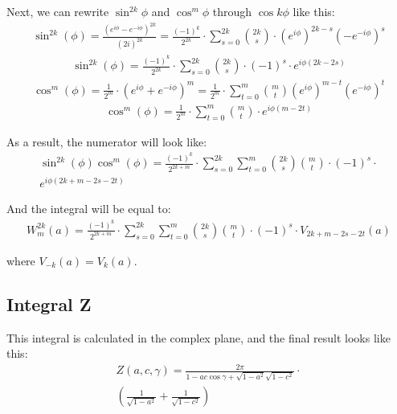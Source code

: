 Next, we can rewrite $\sin^{2k}\phi$  and $\cos^m\phi$ through $\cos k\phi$ like this:
\begin{equation*}\begin{aligned}
\sin^{2k}(\phi) = \frac{\left(e^{i\phi} - e^{-i\phi} \right)^{2k}}{(2i)^{2k}} = \frac{(-1)^k}{2^{2k}} \cdot \sum_{s=0}^{2k} \binom{2k}{s} \cdot (e^{i\phi})^{2k-s} (- e^{-i\phi})^{s}
\end{aligned}\end{equation*}
\begin{equation}\begin{aligned}
\sin^{2k}(\phi) = \frac{(-1)^k}{2^{2k}} \cdot \sum_{s=0}^{2k} \binom{2k}{s} \cdot (-1)^{s} \cdot e^{i\phi (2k - 2s)}
\end{aligned}\end{equation}
\begin{equation*}\begin{aligned}
\cos^m(\phi) = \frac{1}{2^m} \cdot \left( e^{i\phi} + e^{-i\phi} \right)^m = \frac{1}{2^m} \cdot \sum_{t=0}^m \binom{m}{t} (e^{i\phi})^{m-t} (e^{-i\phi})^{t}
\end{aligned}\end{equation*}
\begin{equation}\begin{aligned}
\cos^m(\phi) = \frac{1}{2^m} \cdot \sum_{t=0}^m \binom{m}{t} \cdot e^{i\phi(m-2t)}
\end{aligned}\end{equation}

As a result, the numerator will look like:
\begin{equation}\begin{aligned}
\sin^{2k}(\phi) \cos^m(\phi) =  \frac{(-1)^k}{2^{2k+m}} \cdot \sum_{s=0}^{2k} \sum_{t=0}^m \binom{2k}{s}\binom{m}{t} \cdot (-1)^{s} \cdot \\ e^{i\phi(2k+m - 2s - 2t)}
\end{aligned}\end{equation}

And the integral will be equal to:
\begin{equation}\begin{aligned}
W_m^{2k}(a) =  \frac{(-1)^k}{2^{2k+m}} \cdot \sum_{s=0}^{2k} \sum_{t=0}^m \binom{2k}{s}\binom{m}{t} \cdot (-1)^{s} \cdot  V_{2k+m - 2s - 2t}(a)
\end{aligned}\end{equation}

where $V_{-k}(a) = V_{k}(a)$.

\subsection{Integral Z}
This integral is calculated in the complex plane, and the final result looks like this:
\begin{equation}\begin{aligned}
Z(a, c, \gamma) = \frac{2\pi}{1 - ac\cos\gamma + \sqrt{1-a^2}\sqrt{1-c^2}} \cdot \\ \left(\frac{1}{\sqrt{1-a^2}} + \frac{1}{\sqrt{1-c^2}} \right)
\end{aligned}\end{equation}

